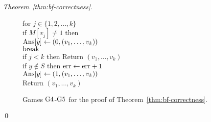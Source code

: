 \begin{proof}[Theorem~\ref{thm:bf-correctness}]
\begin{figure}[tp]
{{for $j \in \{1,2,\ldots,k\}$\\
\nudge if $M[v_j] \neq 1$ then \\
\nudge \nudge $\mathrm{Ans}[y] \gets (0, (v_1, \ldots, v_{k}) )$\\
\nudge \nudge $\mathrm{break}$\\
if $j < k$ then Return $\left(v_1,\ldots,v_k\right)$\\
if $y \not\in S$ then $\mathrm{err} \gets \mathrm{err} +1$\\
$\mathrm{Ans}[y] \gets (1, (v_1, \ldots, v_{k}))$\\
Return $\left(v_1,\ldots,v_k\right)$
}
}
\caption{Games $\text{G4}$-$\text{G5}$ for the
proof of Theorem~\ref{thm:bf-correctness}.}
\label{fig:bf-correctness-games2}
\end{figure}
\hfill\qed
\end{proof}
